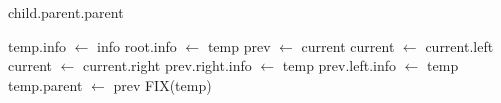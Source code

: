 \documentclass{article}
\begin{document}
\begin{algorithm}
\caption{GRAND(child)}
\begin{algorithmic}
{
	\RETURN child.parent.parent
}
\end{algorithmic}
\end{algorithm}
\begin{algorithm}
\caption{REDBLACK(info)}
\begin{algorithmic}
{
	\STATE temp.info {$\leftarrow$} info
		\STATE root.info {$\leftarrow$} temp
	\ENDIF
	{
		\STATE prev {$\leftarrow$} current
			\STATE current {$\leftarrow$} current.left
		\ELSE
			\STATE current {$\leftarrow$} current.right
		\ENDIF 
	}
	\ENDWHILE
		\STATE prev.right.info {$\leftarrow$} temp
	\ELSE
		\STATE prev.left.info {$\leftarrow$} temp
	\ENDIF
	\STATE temp.parent {$\leftarrow$} prev
	\STATE FIX(temp)
}
\end{algorithmic}
\end{algorithm}
\end{document}
